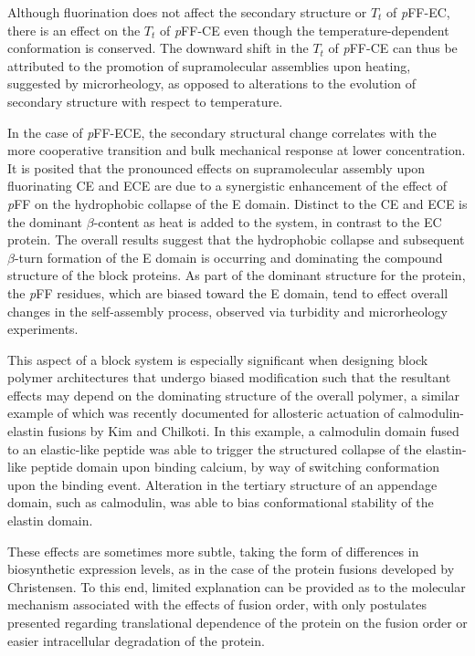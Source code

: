 \begin{refsection}
Although fluorination does not affect the secondary structure or ${T_t}$ of
\emph{p}FF-EC, there is an effect on the ${T_t}$ of \emph{p}FF-CE even though the
temperature-dependent conformation is conserved. The downward shift in the
${T_t}$ of \emph{p}FF-CE can thus be attributed to the promotion of supramolecular
assemblies upon heating, suggested by microrheology, as opposed to alterations
to the evolution of secondary structure with respect to temperature.

In the case of \emph{p}FF-ECE, the secondary structural change correlates with the more
cooperative transition and bulk mechanical response at lower concentration. It
is posited that the pronounced effects on supramolecular assembly upon
fluorinating CE and ECE are due to a synergistic enhancement of the effect of
\emph{p}FF on the hydrophobic collapse of the E domain. Distinct to the CE and ECE is
the dominant ${\beta}$-content as heat is added to the system, in contrast to
the EC protein. The overall results suggest that the hydrophobic collapse and
subsequent ${\beta}$-turn formation of the E domain is occurring and dominating
the compound structure of the block proteins. As part of the dominant structure
for the protein, the \emph{p}FF residues, which are biased toward the E domain, tend to
effect overall changes in the self-assembly process, observed via turbidity and
microrheology experiments.

This aspect of a block system is especially significant when designing block
polymer architectures that undergo biased modification such that the resultant
effects may depend on the dominating structure of the overall polymer, a similar
example of which was recently documented for allosteric actuation of
calmodulin-elastin fusions by Kim and Chilkoti.\cite{Kim2008a} In this example,
a calmodulin domain fused to an elastic-like peptide was able to trigger the
structured collapse of the elastin-like peptide domain upon binding calcium, by
way of switching conformation upon the binding event. Alteration in the tertiary
structure of an appendage domain, such as calmodulin, was able to bias
conformational stability of the elastin domain.

These effects are sometimes more subtle, taking the form of differences in
biosynthetic expression levels, as in the case of the protein fusions developed
by Christensen.\cite{Christensen2009} To this end, limited explanation can be
provided as to the molecular mechanism associated with the effects of fusion
order, with only postulates presented regarding translational dependence of the
protein on the fusion order or easier intracellular degradation of the protein.


\end{refsection}
